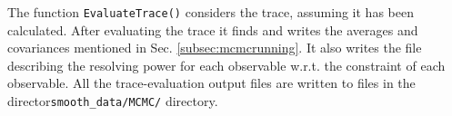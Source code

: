 \documentclass[UserManual.tex]{subfiles}
\begin{document}
The function {\tt EvaluateTrace()} considers the trace, assuming it has been calculated. After evaluating the trace it finds and writes the averages and covariances mentioned in Sec. \ref{subsec:mcmcrunning}. It also writes the file describing the resolving power for each observable w.r.t. the constraint of each observable. All the trace-evaluation output files are written to files in the director{\tt smooth\_data/MCMC/} directory.
\end{document}
